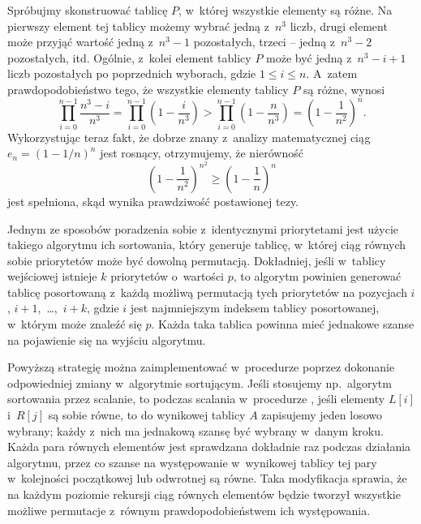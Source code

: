\exercise %
Spróbujmy skonstruować tablicę $P$, w~której wszystkie elementy są różne. Na pierwszy element tej tablicy możemy wybrać jedną z~$n^3$ liczb, drugi element może przyjąć wartość jedną z~$n^3-1$ pozostałych, trzeci -- jedną z~$n^3-2$ pozostałych, itd. Ogólnie,  z~kolei element tablicy $P$ może być jedną z~$n^3-i+1$ liczb pozostałych po poprzednich wyborach, gdzie $1\le i\le n$. A~zatem prawdopodobieństwo tego, że wszystkie elementy tablicy $P$ są różne, wynosi
\[
	\prod_{i=0}^{n-1}\frac{n^3-i}{n^3} = \prod_{i=0}^{n-1}\left(1-\frac{i}{n^3}\right) > \prod_{i=0}^{n-1}\left(1-\frac{n}{n^3}\right) = \left(1-\frac{1}{n^2}\right)^n.
\]
Wykorzystując teraz fakt, że dobrze znany z~analizy matematycznej ciąg $e_n={(1-1/n)}^n$ jest rosnący, otrzymujemy, że nierówność
\[
	\left(1-\frac{1}{n^2}\right)^{n^2} \ge \left(1-\frac{1}{n}\right)^n
\]
jest spełniona, skąd wynika prawdziwość postawionej tezy.

\exercise %
Jednym ze sposobów poradzenia sobie z~identycznymi priorytetami jest użycie takiego algorytmu ich sortowania, który generuje tablicę, w~której ciąg równych sobie priorytetów może być dowolną permutacją. Dokładniej, jeśli w~tablicy wejściowej istnieje $k$ priorytetów o~wartości $p$, to algorytm powinien generować tablicę posortowaną z~każdą możliwą permutacją tych priorytetów na pozycjach $i$, $i+1$,~\dots,~$i+k$, gdzie $i$ jest najmniejszym indeksem tablicy posortowanej, w~którym może znaleźć się $p$. Każda taka tablica powinna mieć jednakowe szanse na pojawienie się na wyjściu algorytmu.

Powyższą strategię można zaimplementować w~procedurze  poprzez dokonanie odpowiedniej zmiany w~algorytmie sortującym. Jeśli stosujemy np.\ algorytm sortowania przez scalanie, to podczas scalania w~procedurze , jeśli elementy $L[i]$ i~$R[j]$ są sobie równe, to do wynikowej tablicy $A$ zapisujemy jeden losowo wybrany; każdy z~nich ma jednakową szansę być wybrany w~danym kroku. Każda para równych elementów jest sprawdzana dokładnie raz podczas działania algorytmu, przez co szanse na występowanie w~wynikowej tablicy tej pary w~kolejności początkowej lub odwrotnej są równe. Taka modyfikacja sprawia, że na każdym poziomie rekursji ciąg równych elementów będzie tworzył wszystkie możliwe permutacje z~równym prawdopodobieństwem ich występowania.


